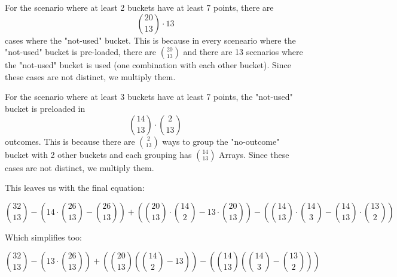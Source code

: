 \documentclass[11pt]{article}
\begin{document}
For the scenario where at least 2 buckets have at least 7 points, there are  
$$\binom{20}{13} \cdot 13$$
cases where the "not-used" bucket. This is because in every sceneario where the "not-used" bucket is pre-loaded, there are $\binom{20}{13}$ and there are 13 scenarios where the "not-used" bucket is used (one combination with each other bucket). Since these cases are not distinct, we multiply them.

For the scenario where at least 3 buckets have at least 7 points, the "not-used" bucket is preloaded in  
$$\binom{14}{13} \cdot \binom{2}{13}$$
outcomes. This is because there are $\binom{2}{13}$ ways to group the "no-outcome" bucket with 2 other buckets and each grouping has $\binom{14}{13}$ Arrays. Since these cases are not distinct, we multiply them.

This leaves us with the final equation:

$$\binom{32}{13} - (14 \cdot \binom{26}{13} - \binom{26}{13}) + (\binom{20}{13} \cdot \binom{14}{2} - 13 \cdot \binom{20}{13}) - (\binom{14}{13} \cdot \binom{14}{3} - \binom{14}{13} \cdot \binom{13}{2})$$

Which simplifies too:


$$\binom{32}{13} - (13 \cdot \binom{26}{13}) + (\binom{20}{13} (\binom{14}{2} - 13 )) - (\binom{14}{13} (\binom{14}{3} - \binom{13}{2}))$$
\end{document}
